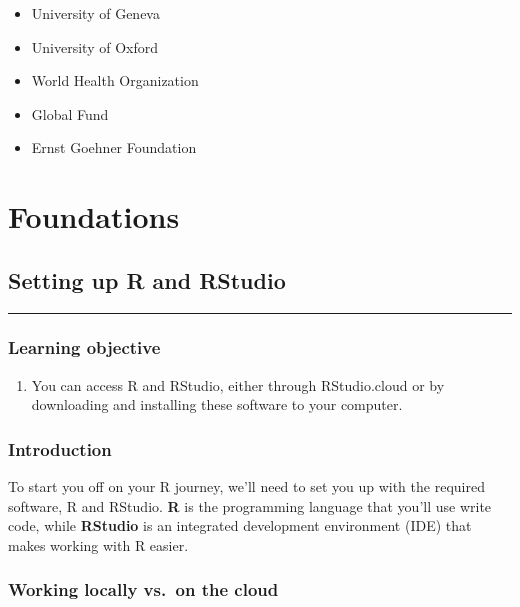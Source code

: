 \documentclass[
  letterpaper,
  DIV=11,
  numbers=noendperiod]{scrreprt}
\providecommand{\tightlist}{%
  \setlength{\itemsep}{0pt}\setlength{\parskip}{0pt}}\usepackage{longtable,booktabs,array}
\begin{document}

\begin{itemize}
\tightlist
\item
  University of Geneva
\item
  University of Oxford
\item
  World Health Organization
\item
  Global Fund
\item
  Ernst Goehner Foundation
\end{itemize}

\part{Foundations}

\chapter{Setting up R and RStudio}\label{setting-up-r-and-rstudio}

\begin{center}\rule{0.5\linewidth}{0.5pt}\end{center}

\section*{Learning objective}\label{learning-objective}


\begin{enumerate}
\def\labelenumi{\arabic{enumi}.}
\tightlist
\item
  You can access R and RStudio, either through RStudio.cloud or by
  downloading and installing these software to your computer.
\end{enumerate}

\section{Introduction}\label{introduction-1}

To start you off on your R journey, we'll need to set you up with the
required software, R and RStudio. \textbf{R} is the programming language
that you'll use write code, while \textbf{RStudio} is an integrated
development environment (IDE) that makes working with R easier.

\section{Working locally vs.~on the
cloud}\label{working-locally-vs.-on-the-cloud}
\end{document}
